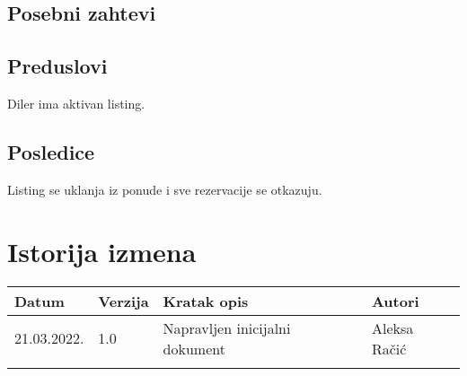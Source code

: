 \documentclass[12pt]{article}
\begin{document}
\subsection{Posebni zahtevi}
\subsection{Preduslovi}
Diler ima aktivan listing.
\subsection{Posledice}
Listing se uklanja iz ponude i sve rezervacije se otkazuju.

\section{Istorija izmena}
\begin{center}
\begin{tabular}{ | m{2cm} | m{1.5cm}| m{6cm} | m{5cm} | } 
\hline
Datum & Verzija & Kratak opis & Autori \\ 
\hline
 21.03.2022. & 1.0 & Napravljen inicijalni dokument & Aleksa Račić\\ 
\hline
&&&\\ 
\hline
\end{tabular}
\end{center}
\end{document}
